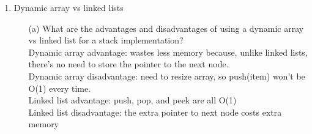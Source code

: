 \documentclass[letter]{article}
\begin{document}
\begin{enumerate}[1.]
\begin{itemize}
    \begin{lstlisting}[language = Java , frame = trBL , firstnumber = 0 , escapeinside={(*@}{@*)}]
Stack<String> myStack = new Stack<string>();
myStack.push("meow");
myStack.push("woof");
myStack.push("moo");
myStack.push("oink");
String sound = myStack.peek();

while (!myStack.isEmpty()) { //isEmpty returns true if stack is empty
    System.out.println(names.pop());
}
System.out.println(sound);
    \end{lstlisting}
    oink\\
    moo\\
    woof\\
    meow\\
    oink
    \item [(c)] (Adapted from Koffman-Wolfgang) What is the output of the following:

    \begin{lstlisting}[language = Java , frame = trBL , firstnumber = 0 , escapeinside={(*@}{@*)}]
Queue<String> myQueue = new Queue<string>();
myQueue.enqueue("meow");
myQueue.enqueue("woof");
myQueue.enqueue("moo");
myQueue.enqueue("oink");
String sound = myStack.peek();

while (!myStack.isEmpty()) { //isEmpty returns true if stack is empty
    System.out.println(names.dequeue());
}
System.out.println(sound);
    \end{lstlisting}
    meow\\
    woof\\
    moo\\
    oink\\
    meow
    \end{itemize}
    
    \item Dynamic array vs linked lists
    \begin{itemize}
        \item [(a)] What are the advantages and disadvantages of using a dynamic array vs linked list for a stack implementation?\\

        Dynamic array advantage: wastes less memory because, unlike linked lists, there's no need to store the pointer to the next node.\\
        Dynamic array disadvantage: need to resize array, so push(item) won't be O(1) every time.\\

        Linked list advantage: push, pop, and peek are all O(1)\\
        Linked list disadvantage: the extra pointer to next node costs extra memory
        

\end{itemize}
\end{enumerate}
\end{document}
